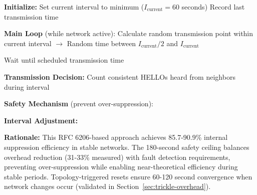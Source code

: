 \begin{algorithm}[H]
\caption{Trickle Adaptive HELLO Scheduler}
\label{alg:trickle}
\SetAlgoLined
\DontPrintSemicolon

\textbf{Initialize:}\;
\Indp
Set current interval to minimum ($I_{\text{current}} = 60$ seconds)\;
Record last transmission time\;
\Indm

\textbf{Main Loop} (while network active):\;
\Indp
Calculate random transmission point within current interval\;
\Indp
$\rightarrow$ Random time between $I_{\text{current}}/2$ and $I_{\text{current}}$\;
\Indm

Wait until scheduled transmission time\;

\textbf{Transmission Decision:}\;
\Indp
Count consistent HELLOs heard from neighbors during interval\;

\Indm

\textbf{Safety Mechanism} (prevent over-suppression):\;
\Indp
{}
\Indm

\textbf{Interval Adjustment:}\;
\Indp
{}
\Indm
\Indm
\end{algorithm}

\textbf{Rationale:} This RFC 6206-based approach achieves 85.7-90.9\% internal suppression efficiency in stable networks. The 180-second safety ceiling balances overhead reduction (31-33\% measured) with fault detection requirements, preventing over-suppression while enabling near-theoretical efficiency during stable periods. Topology-triggered resets ensure 60-120 second convergence when network changes occur (validated in Section~\ref{sec:trickle-overhead}).

